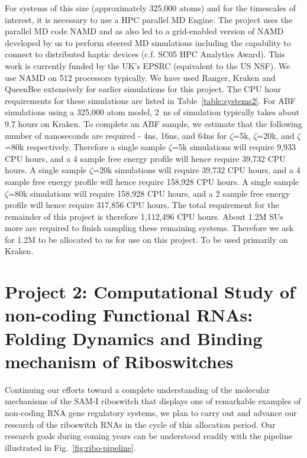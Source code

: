 \documentclass[a4paper,10pt]{article}
\begin{document}
For systems of this size (approximately 325,000 atoms) and for the timescales of interest, it is necessary to use a HPC parallel MD Engine.  The project uses the parallel MD code NAMD and as also led to a grid-enabled version of NAMD developed by us to perform steered MD simulations including the capability to connect to distributed haptic devices (c.f. SC05 HPC Analytics Award). This work is currently funded by the UK's EPSRC (equivalent to the US NSF).  We use NAMD on 512 processors typically. We have used Ranger, Kraken and QueenBee extensively for earlier simulations for this project. The CPU hour requirements for these simulations are listed in Table~\ref{table:systems2}. For ABF simulations using a 325,000 atom model, 2~ns of simulation typically takes about 9.7 hours on Kraken. To complete an ABF sample, we estimate that the following number of nanoseconds are required - 4ns, 16ns, and 64ns for $\zeta$=5k, $\zeta$=20k, and $\zeta$=80k respectively. Therefore a single sample $\zeta$=5k simulations will require 9,933 CPU hours, and a 4 sample free energy profile will hence require 39,732 CPU hours. A single sample $\zeta$=20k simulations will require 39,732 CPU hours, and a 4 sample free energy profile will hence require 158,928 CPU hours. A single sample $\zeta$=80k simulations will require 158,928 CPU hours, and a 2 sample free energy profile will hence require 317,856 CPU hours. The total requirement for the remainder of this project is therefore 1,112,496 CPU hours. About 1.2M SUs more are required to finish sampling these remaining systems.  Therefore we ask for 1.2M to be allocated to us for use on this project. To be used primarily on Kraken.

\section*{Project 2: Computational Study of non-coding Functional RNAs: Folding Dynamics and Binding mechanism of Riboswitches}

Continuing our efforts toward a complete understanding of the molecular mechanisms of the SAM-I riboswitch that displays one of remarkable examples of non-coding RNA gene regulatory systems, we plan to carry out and advance our research of the riboswitch RNAs in the cycle of this allocation period.  Our research goals during coming years can be understood readily with the pipeline illustrated in Fig.~\ref{fig:ribo-pipeline}. 
\end{document}

